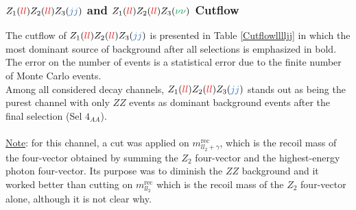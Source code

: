 \documentclass[a4paper,11pt]{article}
\begin{document}
    \noindent
    \subsubsection[$Z_1(\textcolor{red}{ll})Z_2(\textcolor{red}{ll})Z_3(\textcolor{NavyBlue}{jj})$ and $Z_1(\textcolor{red}{ll})Z_2(\textcolor{red}{ll})Z_3(\textcolor{Green}{\nu\nu})$ Cutflow]{\boldmath$Z_1(\textcolor{red}{ll})Z_2(\textcolor{red}{ll})Z_3(\textcolor{NavyBlue}{jj})$ and $Z_1(\textcolor{red}{ll})Z_2(\textcolor{red}{ll})Z_3(\textcolor{Green}{\nu\nu})$ Cutflow}
    The cutflow of $Z_1(\textcolor{red}{ll})Z_2(\textcolor{red}{ll})Z_3(\textcolor{NavyBlue}{jj})$ is presented in Table \ref{Cutflowlllljj} in which the most dominant source of background after all selections is emphasized in bold. The error on the number of events is a statistical error due to the finite number of Monte Carlo events.\\
    Among all considered decay channels, $Z_1(\textcolor{red}{ll})Z_2(\textcolor{red}{ll})Z_3(\textcolor{NavyBlue}{jj})$ stands out as being the purest channel with only $ZZ$ events as dominant background events after the final selection (Sel $4_{AA}$).\\\\
    \underline{Note}: for this channel, a cut was applied on $m^{\mbox{rec}}_{ll_2+\gamma}$, which is the recoil mass of the four-vector obtained by summing the $Z_2$ four-vector and the highest-energy photon four-vector. Its purpose was to diminish the $ZZ$ background and it worked better than cutting on $m^{\mbox{rec}}_{ll_2}$ which is the recoil mass of the $Z_2$ four-vector alone, although it is not clear why.
\end{document}
